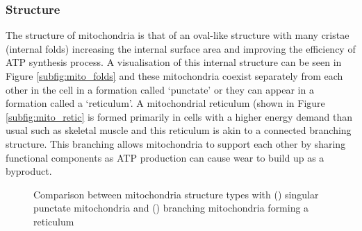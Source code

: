 \subsubsection*{Structure}
The structure of mitochondria is that of an oval-like structure with many cristae (internal folds) increasing the internal surface area and improving the efficiency of ATP synthesis process. A visualisation of this internal structure can be seen in Figure \ref{subfig:mito_folds} and these mitochondria coexist separately from each other in the cell in a formation called `punctate' or they can appear in a formation called a `reticulum'. A mitochondrial reticulum (shown in Figure \ref{subfig:mito_retic} is formed primarily in cells with a higher energy demand than usual such as skeletal muscle and this reticulum is akin to a connected branching structure. This branching allows mitochondria to support each other by sharing functional components as ATP production can cause wear to build up as a byproduct.
\begin{figure}
    \centering
    \caption[Comparison between punctate and branching mitochondria structures]{Comparison between mitochondria structure types with () singular punctate mitochondria and () branching mitochondria forming a reticulum}
    \label{fig:mito_struct}
\end{figure}
